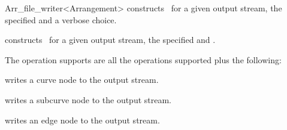 \begin{ccRefClass}{Arr_file_writer<Arrangement>}
{constructs \ccRefName\ for a given output stream, the specified  and a verbose choice.}

{constructs \ccRefName\ for a given output stream, the specified  and .}

\ccOperations

The operation \ccRefName \/ supports are all the operations  supported plus the following:

{writes a curve node to the output stream.}

{writes a subcurve node to the output stream.}

{writes an edge node to the output stream.}

\end{ccRefClass} %

\ccRefPageEnd











